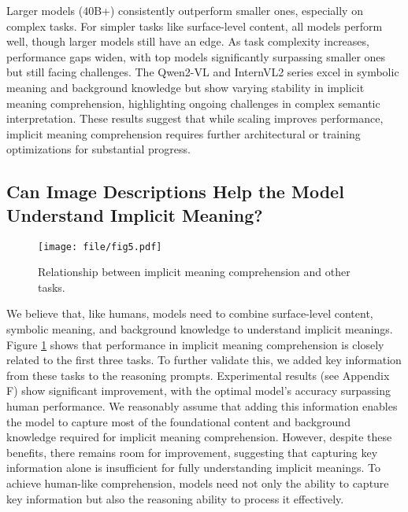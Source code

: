 Larger models (40B+) consistently outperform smaller ones, especially on complex tasks. For simpler tasks like surface-level content, all models perform well, though larger models still have an edge. As task complexity increases, performance gaps widen, with top models significantly surpassing smaller ones but still facing challenges. The Qwen2-VL and InternVL2 series excel in symbolic meaning and background knowledge but show varying stability in implicit meaning comprehension, highlighting ongoing challenges in complex semantic interpretation. These results suggest that while scaling improves performance, implicit meaning comprehension requires further architectural or training optimizations for substantial progress.

\subsection{Can Image Descriptions Help the Model Understand Implicit Meaning?}
\begin{figure}[t]
  \centering
  \texttt{[image: file/fig5.pdf]}
   \caption{Relationship between implicit meaning comprehension and other tasks.}
   \label{fig:6.2}
\end{figure}
We believe that, like humans, models need to combine surface-level content, symbolic meaning, and background knowledge to understand implicit meanings. Figure \ref{fig:6.2} shows that performance in implicit meaning comprehension is closely related to the first three tasks. To further validate this, we added key information from these tasks to the reasoning prompts. Experimental results (see Appendix F) show significant improvement, with the optimal model's accuracy surpassing human performance. We reasonably assume that adding this information enables the model to capture most of the foundational content and background knowledge required for implicit meaning comprehension.  However, despite these benefits, there remains room for improvement, suggesting that capturing key information alone is insufficient for fully understanding implicit meanings. To achieve human-like comprehension, models need not only the ability to capture key information but also the reasoning ability to process it effectively.

